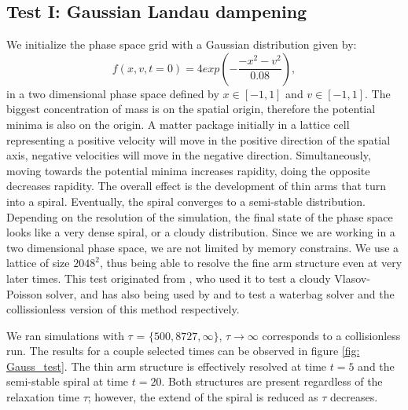\documentclass[fleqn,usenatbib]{mnras}
\begin{document}
\subsection{Test I: Gaussian Landau dampening}
\label{sec: test_gauss}
We initialize the phase space grid with a Gaussian distribution given by:
\begin{equation}
f(x,v,t = 0) = 4 exp(-\frac{-x^2-v^2}{0.08}),
\end{equation} 
in a two dimensional phase space defined by $x \in [-1,1]$ and $v \in [-1,1]$.
The biggest concentration of mass is on the spatial origin, therefore the potential minima is also on the origin.
A matter package initially in a lattice cell representing a positive velocity will move in the positive direction of the spatial axis, negative velocities will move in the negative direction.
Simultaneously, moving towards the potential minima increases rapidity, doing the opposite decreases rapidity.
The overall effect is the development of thin arms that turn into a spiral. Eventually, the spiral converges to a semi-stable distribution. Depending on the resolution of the simulation, the final state of the phase space looks like a very dense spiral, or a cloudy distribution.
Since we are working in a two dimensional phase space, we are not limited by memory constrains. We use a lattice of size $2048^2$, thus being able to resolve the fine arm structure even at very later times.
This test originated from \citet{2005MNRAS.359..123A}, who used it to test a cloudy Vlasov-Poisson solver, and has also being used by \citet{2014MNRAS.441.2414C} and \citet{integerLatticeDynamics} to test a waterbag solver and the collissionless version of this method respectively.

We ran simulations with $\tau$ = $\{500,8727, \infty\}$, $\tau \rightarrow \infty$ corresponds to a collisionless run.
The results for a couple selected times can be observed in figure \ref{fig: Gauss_test}.
The thin arm structure is effectively resolved at time $t=5$ and the semi-stable spiral at time $t=20$. Both structures are present regardless of the relaxation time $\tau$; however, the extend of the spiral is reduced as $\tau$ decreases.
\end{document}
